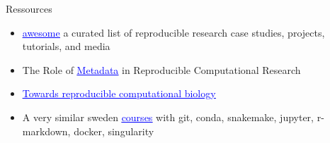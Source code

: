 \begin{frame}{Ressources}
\begin{itemize}
    \item \href{https://github.com/leipzig/awesome-reproducible-research}{\textcolor{blue}{\underline{awesome}}} a curated list of reproducible research case studies, projects, tutorials, and media
    \item The Role of \href{https://arxiv.org/pdf/2006.08589.pdf}{\textcolor{blue}{\underline{Metadata}}} in Reproducible Computational Research
    \item \href{https://reproducibility.sschmeier.com}{\textcolor{blue}{\underline{Towards reproducible computational biology}}}
    \item A very similar sweden \href{https://nbis-reproducible-research.readthedocs.io/en/latest/}{\textcolor{blue}{\underline{courses}}} with git, conda, snakemake, jupyter, r-markdown, docker, singularity
\end{itemize}
\end{frame}
